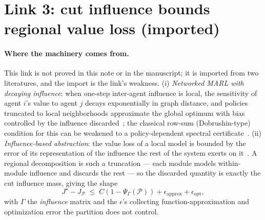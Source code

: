\documentclass[11pt]{article}
\theoremstyle{definition}
\theoremstyle{remark}
\newcommand{\PsiG}{\Psi_{\Gamma}}
\begin{document}
\section{Link 3: cut influence bounds regional value loss (imported)}
\label{sec:link3}

\paragraph{Where the machinery comes from.}
This link is not proved in this note or in the manuscript; it is imported
from two literatures, and the import is the link's weakness.
(i) \emph{Networked MARL with decaying influence}: when one-step
inter-agent influence is local, the sensitivity of agent $i$'s value to agent
$j$ decays exponentially in graph distance, and policies truncated to local
neighborhoods approximate the global optimum with bias controlled by the
influence discarded~\citep{qu2020average,qu2022scalable}; the classical
row-sum (Dobrushin-type) condition for this can be weakened to a
policy-dependent spectral certificate~\citep{chakraborty2026locality}.
(ii) \emph{Influence-based abstraction}: the value loss of a local model is
bounded by the error of its representation of the influence the rest of the
system exerts on it~\citep{congeduti2021iba}.
A regional decomposition is such a truncation --- each module models
within-module influence and discards the rest --- so the discarded quantity
is exactly the cut influence mass, giving the shape
\begin{equation}
    J^\star - J_{\mathcal{P}}
    \;\leq\;
    C \left(1 - \PsiG(\mathcal{P})\right)
    + \epsilon_{\mathrm{approx}} + \epsilon_{\mathrm{opt}},
    \label{eq:valueloss}
\end{equation}
with $\Gamma$ the \emph{influence} matrix and the $\epsilon$'s collecting
function-approximation and optimization error the partition does not control.
\end{document}
